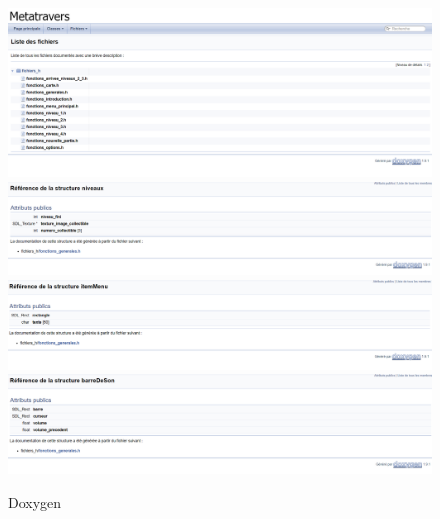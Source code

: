 \documentclass[12pt,a4paper]{article}
\begin{document}
            \begin{figure}[h]
                \includegraphics[width=13cm]{images/doxygen_html.png}\\
                \includegraphics[width=13cm]{images/doxygen_niveau.png}\\
                \includegraphics[width=13cm]{images/doxygen_itemMenu.png}\\
                \includegraphics[width=13cm]{images/doxygen_barreDeSon.png}
                \caption{Doxygen}
            \end{figure}
            
\end{document}
